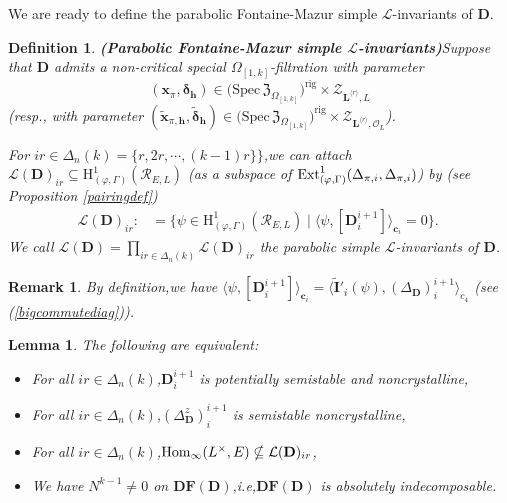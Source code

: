 \documentclass[SecEq,CM,GP]{degruyter-crelle} %
\theoremstyle{plain}
\newtheorem{lem}[thm]{Lemma}
\newtheorem{dfn}[thm]{Definition}
\newtheorem{rmk}[thm]{Remark}
\newcommand{\bmdel}{{ \bm{\delta}_\bh}}
\newcommand{\df}{{\mathbf{DF}}}
\newcommand{\Dpik}{{\mathbf{D}}}
\newcommand{\ext}{{\rm Ext}}
\newcommand{\homo}{{\rm Hom}}
\newcommand{\hH}{{\mathrm{H}}}
\newcommand{\lrr}{{\langle r\rangle}}
\newcommand{\omepik}{\Omega_{[1,k]}}
\newcommand{\padelc}{{(\Delta_{\Dpik}^z)}}
\newcommand{\rigch}{{\mathcal{Z}_{\bL^{\lrr},\mathcal{O}_L}}}
\newcommand{\rigchl}{{\mathcal{Z}_{\bL^{\lrr},L}}}
\newcommand{\sbanpik}{{\big(\mathrm{Spec}\hspace{2pt}\mathfrak{Z}_{\omepik}\big)^{\mathrm{rig}}}}
\newcommand{\bL}{{\mathbf{L}}}
\newcommand{\bc}{{\mathbf{c}}}
\newcommand{\bx}{{\mathbf{x}}}
\newcommand{\bh}{{\mathbf{h}}}
\newcommand{\cR}{\mathcal R}
\newcommand{\sL}{\mathcal L}
\begin{document}
We are ready to define the parabolic Fontaine-Mazur simple $\sL$-invariants of $\Dpik$.\;
\begin{dfn}\textbf{(Parabolic Fontaine-Mazur simple $\sL$-invariants)}Suppose that $\Dpik$ admits a
non-critical special $\omepik$-filtration with parameter \[(\bx_{\pi},\bmdel)\in \sbanpik\times\rigchl \] (resp.,\; with parameter $(\widetilde{\bx}_{\pi,\bh},\widetilde{\bm{\delta}}_\bh)\in \sbanpik\times\rigch $).\;

For $ir\in \Delta_n(k)=\{r,2r,\cdots,(k-1)r\}\}$,\;we can attach $\sL(\Dpik)_{ir}\subseteq \hH^1_{(\varphi,\Gamma)}(\cR_{E,L})$ (as a subspace of $\ext^1_{(\varphi,\Gamma)}(\Delta_{\pi,i},\Delta_{\pi,i})$) by (see Proposition \ref{pairingdef})
\begin{equation}\label{dfnl-invariant}
	\begin{aligned}
		\sL(\Dpik)_{ir}:&=\{\psi\in \hH^1_{(\varphi,\Gamma)}(\cR_{E,L})\;|\;\langle \psi,[\Dpik^{i+1}_{i}]\rangle_{\bc_i}=0\}.\;
	\end{aligned}
\end{equation}
We call $\sL(\Dpik)=\prod_{ir\in \Delta_n(k)}\sL(\Dpik)_{ir}$ the parabolic simple $\sL$-invariants of $\Dpik$.\;
\end{dfn}
\begin{rmk}By definition,\;we have $\langle \psi,[\Dpik^{i+1}_{i}]\rangle_{\bc_i}=\langle   \widetilde{\mathbf{I}}'_{i}(\psi),({\Delta_{\Dpik}})^{i+1}_{i}\rangle_{c_4}$ (see (\ref{bigcommutediag})).\;
\end{rmk}
\begin{lem}\label{criofnoncrystalline}The following are equivalent:
\begin{itemize}
	\item[(a)] For all $ir\in \Delta_n(k)$,\;$
	\Dpik^{i+1}_i$ is potentially semistable and noncrystalline,\;
	\item[(b)] For all $ir\in \Delta_n(k)$,\;$\padelc^{i+1}_{i}$ is  semistable noncrystalline,
	\item[(c)] For all $ir\in \Delta_n(k)$,\;$\homo_\infty(L^\times,E)\nsubseteq \sL(\Dpik)_{ir}$,\;
	\item[(d)]  We have $N^{k-1}\neq 0$ on $\df(\Dpik)$,\;i.e,\;$\df(\Dpik)$ is absolutely indecomposable. 
\end{itemize}
\end{lem}
\end{document}

